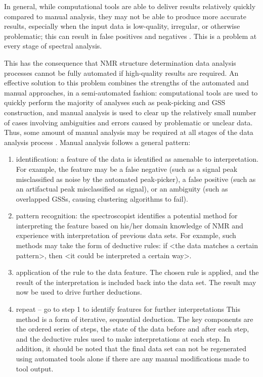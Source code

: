 In general, while computational tools are able to deliver results relatively 
quickly compared to manual analysis, they may not be able to produce more 
accurate results, especially when the input data is low-quality, irregular, or 
otherwise problematic; this can result in false positives and negatives
\cite{williamson2009automated}.  This is a problem at every stage of spectral
analysis.

This has the consequence that NMR structure determination data analysis 
processes cannot be fully automated if high-quality results are required.  
An effective solution to this problem combines the strengths of the automated 
and manual approaches, in a semi-automated fashion:  computational tools are 
used to quickly perform the majority of analyses such as peak-picking and 
GSS construction, and manual analysis is used to clear up the 
relatively small number of cases involving ambiguities and errors caused 
by problematic or unclear data.  Thus, some amount of manual analysis may 
be required at all stages of the data analysis process 
\cite{guntert2009automated, williamson2009automated}.   
Manual analysis follows a general pattern:
\begin{enumerate}
  \item identification: a feature of the data is identified as amenable to 
  interpretation.  For example, the feature may be a false negative (such as 
  a signal peak misclassified as noise by the automated peak-picker), a false 
  positive (such as an artifactual peak misclassified as signal), or an 
  ambiguity (such as overlapped GSSs, causing clustering algorithms to fail).
  \item pattern recognition: the spectroscopist identifies a potential method 
  for interpreting the feature based on his/her domain knowledge of NMR and 
  experience with interpretation of previous data sets.  For example, such 
  methods may take the form of deductive rules:  if <the data matches a 
  certain pattern>, then <it could be interpreted a certain way>.
  \item application of the rule to the data feature.  The chosen rule is 
  applied, and the result of the interpretation is included back into the 
  data set.  The result may now be used to drive further deductions.
  \item repeat -- go to step 1 to identify features for further interpretations
This method is a form of iterative, sequential deduction.  The key components 
are the ordered series of steps, the state of the data before and after each 
step, and the deductive rules used to make interpretations at each step.  In 
addition, it should be noted that the final data set can not be regenerated 
using automated tools alone if there are any manual modifications made to 
tool output.
\end{enumerate}


